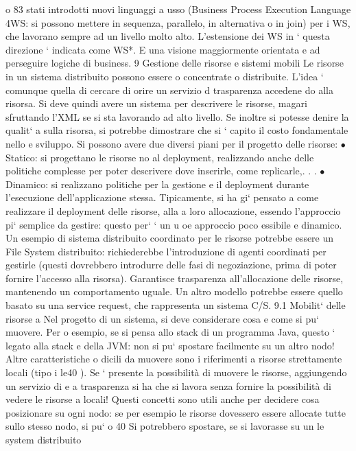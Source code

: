 \documentclass[a4paper,12pt]{article}
\begin{document}
o
83
stati introdotti nuovi linguaggi a usso (Business Process Execution Language
4WS: si possono mettere in sequenza, parallelo, in alternativa o in join) per
i WS, che lavorano sempre ad un livello molto alto. L'estensione dei WS in
`
questa direzione ` indicata come WS*. E una visione maggiormente orientata
e
ad perseguire logiche di business.
9
Gestione delle risorse e sistemi mobili
Le risorse in un sistema distribuito possono essere o concentrate o distribuite.
L'idea ` comunque quella di cercare di orire un servizio d trasparenza accedene
do alla risorsa.
Si deve quindi avere un sistema per descrivere le risorse, magari sfruttando
l'XML se si sta lavorando ad alto livello. Se inoltre si potesse denire la qualit`
a
sulla risorsa, si potrebbe dimostrare che si ` capito il costo fondamentale nello
e
sviluppo.
Si possono avere due diversi piani per il progetto delle risorse:
$\bullet$ Statico: si progettano le risorse no al deployment, realizzando anche delle
politiche complesse per poter descrivere dove inserirle, come replicarle,. . .
$\bullet$ Dinamico: si realizzano politiche per la gestione e il deployment durante
l'esecuzione dell'applicazione stessa.
Tipicamente, si ha gi` pensato a come realizzare il deployment delle risorse, alla
a
loro allocazione, essendo l'approccio pi` semplice da gestire: questo per` ` un
u
oe
approccio poco essibile e dinamico.
Un esempio di sistema distribuito coordinato per le risorse potrebbe essere
un File System distribuito: richiederebbe l'introduzione di agenti coordinati per
gestirle (questi dovrebbero introdurre delle fasi di negoziazione, prima di poter
fornire l'accesso alla risorsa). Garantisce trasparenza all'allocazione delle risorse,
mantenendo un comportamento uguale. Un altro modello potrebbe essere quello
basato su una service request, che rappresenta un sistema C/S.
9.1
Mobilit` delle risorse
a
Nel progetto di un sistema, si deve considerare cosa e come si pu` muovere. Per
o
esempio, se si pensa allo stack di un programma Java, questo ` legato alla stack
e
della JVM: non si pu` spostare facilmente su un altro nodo! Altre caratteristiche
o
dicili da muovere sono i riferimenti a risorse strettamente locali (tipo i le40 ).
Se ` presente la possibilità di muovere le risorse, aggiungendo un servizio di
e
a
trasparenza si ha che si lavora senza fornire la possibilità di vedere le risorse
a
locali!
Questi concetti sono utili anche per decidere cosa posizionare su ogni nodo:
se per esempio le risorse dovessero essere allocate tutte sullo stesso nodo, si pu`
o
40 Si
potrebbero spostare, se si lavorasse su un le system distribuito
\end{document}
